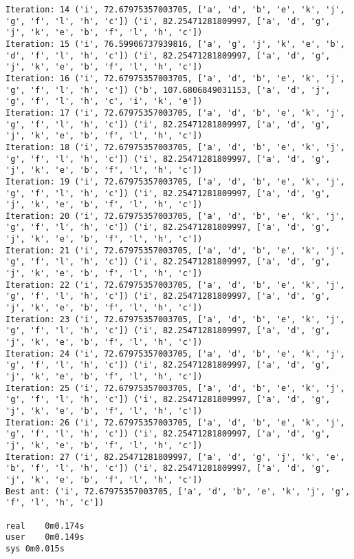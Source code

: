 \documentclass[english,man]{apa6}
\begin{document}
\begin{verbatim}
Iteration: 14 ('i', 72.67975357003705, ['a', 'd', 'b', 'e', 'k', 'j', 'g', 'f', 'l', 'h', 'c']) ('i', 82.25471281809997, ['a', 'd', 'g', 'j', 'k', 'e', 'b', 'f', 'l', 'h', 'c'])
Iteration: 15 ('i', 76.59906737939816, ['a', 'g', 'j', 'k', 'e', 'b', 'd', 'f', 'l', 'h', 'c']) ('i', 82.25471281809997, ['a', 'd', 'g', 'j', 'k', 'e', 'b', 'f', 'l', 'h', 'c'])
Iteration: 16 ('i', 72.67975357003705, ['a', 'd', 'b', 'e', 'k', 'j', 'g', 'f', 'l', 'h', 'c']) ('b', 107.6806849031153, ['a', 'd', 'j', 'g', 'f', 'l', 'h', 'c', 'i', 'k', 'e'])
Iteration: 17 ('i', 72.67975357003705, ['a', 'd', 'b', 'e', 'k', 'j', 'g', 'f', 'l', 'h', 'c']) ('i', 82.25471281809997, ['a', 'd', 'g', 'j', 'k', 'e', 'b', 'f', 'l', 'h', 'c'])
Iteration: 18 ('i', 72.67975357003705, ['a', 'd', 'b', 'e', 'k', 'j', 'g', 'f', 'l', 'h', 'c']) ('i', 82.25471281809997, ['a', 'd', 'g', 'j', 'k', 'e', 'b', 'f', 'l', 'h', 'c'])
Iteration: 19 ('i', 72.67975357003705, ['a', 'd', 'b', 'e', 'k', 'j', 'g', 'f', 'l', 'h', 'c']) ('i', 82.25471281809997, ['a', 'd', 'g', 'j', 'k', 'e', 'b', 'f', 'l', 'h', 'c'])
Iteration: 20 ('i', 72.67975357003705, ['a', 'd', 'b', 'e', 'k', 'j', 'g', 'f', 'l', 'h', 'c']) ('i', 82.25471281809997, ['a', 'd', 'g', 'j', 'k', 'e', 'b', 'f', 'l', 'h', 'c'])
Iteration: 21 ('i', 72.67975357003705, ['a', 'd', 'b', 'e', 'k', 'j', 'g', 'f', 'l', 'h', 'c']) ('i', 82.25471281809997, ['a', 'd', 'g', 'j', 'k', 'e', 'b', 'f', 'l', 'h', 'c'])
Iteration: 22 ('i', 72.67975357003705, ['a', 'd', 'b', 'e', 'k', 'j', 'g', 'f', 'l', 'h', 'c']) ('i', 82.25471281809997, ['a', 'd', 'g', 'j', 'k', 'e', 'b', 'f', 'l', 'h', 'c'])
Iteration: 23 ('i', 72.67975357003705, ['a', 'd', 'b', 'e', 'k', 'j', 'g', 'f', 'l', 'h', 'c']) ('i', 82.25471281809997, ['a', 'd', 'g', 'j', 'k', 'e', 'b', 'f', 'l', 'h', 'c'])
Iteration: 24 ('i', 72.67975357003705, ['a', 'd', 'b', 'e', 'k', 'j', 'g', 'f', 'l', 'h', 'c']) ('i', 82.25471281809997, ['a', 'd', 'g', 'j', 'k', 'e', 'b', 'f', 'l', 'h', 'c'])
Iteration: 25 ('i', 72.67975357003705, ['a', 'd', 'b', 'e', 'k', 'j', 'g', 'f', 'l', 'h', 'c']) ('i', 82.25471281809997, ['a', 'd', 'g', 'j', 'k', 'e', 'b', 'f', 'l', 'h', 'c'])
Iteration: 26 ('i', 72.67975357003705, ['a', 'd', 'b', 'e', 'k', 'j', 'g', 'f', 'l', 'h', 'c']) ('i', 82.25471281809997, ['a', 'd', 'g', 'j', 'k', 'e', 'b', 'f', 'l', 'h', 'c'])
Iteration: 27 ('i', 82.25471281809997, ['a', 'd', 'g', 'j', 'k', 'e', 'b', 'f', 'l', 'h', 'c']) ('i', 82.25471281809997, ['a', 'd', 'g', 'j', 'k', 'e', 'b', 'f', 'l', 'h', 'c'])
Best ant: ('i', 72.67975357003705, ['a', 'd', 'b', 'e', 'k', 'j', 'g', 'f', 'l', 'h', 'c'])

real    0m0.174s
user    0m0.149s
sys 0m0.015s
\end{verbatim}
\end{document}
